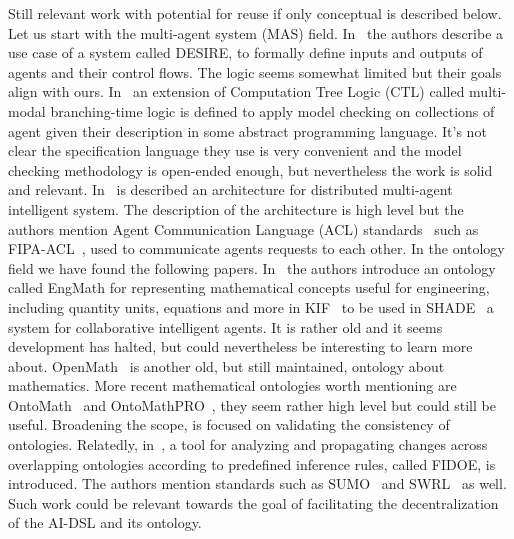 \documentclass[]{report}
\begin{document}
Still relevant work with potential for reuse if only conceptual is
described below.  Let us start with the multi-agent system (MAS)
field. In~\cite{Brazier1995} the authors describe a use case of a
system called DESIRE, to formally define inputs and outputs of agents
and their control flows.  The logic seems somewhat limited but their
goals align with ours.  In~\cite{Bourahla20055} an extension of
Computation Tree Logic (CTL) called multi-modal branching-time logic
is defined to apply model checking on collections of agent given their
description in some abstract programming language.  It's not clear the
specification language they use is very convenient and the model
checking methodology is open-ended enough, but nevertheless the work
is solid and relevant.  In~\cite{Desouky2007} is described an
architecture for distributed multi-agent intelligent system.  The
description of the architecture is high level but the authors mention
Agent Communication Language (ACL) standards~\cite{Labrou99thecurrent}
such as FIPA-ACL~\cite{FIPAACL}, used to communicate agents requests
to each other.  In the ontology field we have found the following
papers.  In~\cite{Gruber_anontology} the authors introduce an ontology
called EngMath for representing mathematical concepts useful for
engineering, including quantity units, equations and more in
KIF~\cite{KIF} to be used in SHADE~\cite{Gruber92towarda} a system for
collaborative intelligent agents.  It is rather old and it seems
development has halted, but could nevertheless be interesting to learn
more about.  OpenMath~\cite{Abbot1995} is another old, but still
maintained, ontology about mathematics.  More recent mathematical
ontologies worth mentioning are OntoMath~\cite{Elizarov2017} and
OntoMathPRO~\cite{nevzorova2014ontomathpro}, they seem rather high
level but could still be useful.  Broadening the scope,
\cite{Roelofs2020} is focused on validating the consistency of
ontologies.  Relatedly, in~\cite{Witherell2009}, a tool for analyzing
and propagating changes across overlapping ontologies according to
predefined inference rules, called FIDOE, is introduced.  The authors
mention standards such as SUMO~\cite{pease_standard_2009} and
SWRL~\cite{SWRL} as well.  Such work could be relevant towards the
goal of facilitating the decentralization of the AI-DSL and its
ontology.

\end{document}
